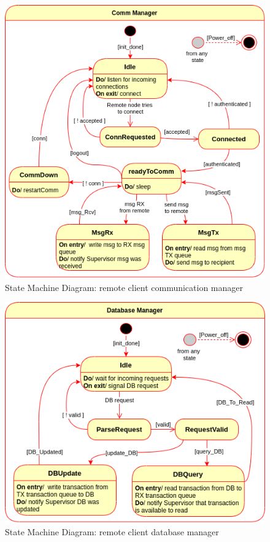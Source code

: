 \begin{figure}[htb!]
\centering
    \includegraphics[width=0.9\columnwidth]{./img/state-mach-rc-comm.png}
  \caption{State Machine Diagram: remote client communication manager}%
\label{fig:state-mach-rc-comm}
\end{figure}
%
\begin{figure}[htb!]
\centering
    \includegraphics[width=0.9\columnwidth]{./img/state-mach-rc-db.png}
  \caption{State Machine Diagram: remote client database manager}%
\label{fig:state-mach-rc-db}
\end{figure}
